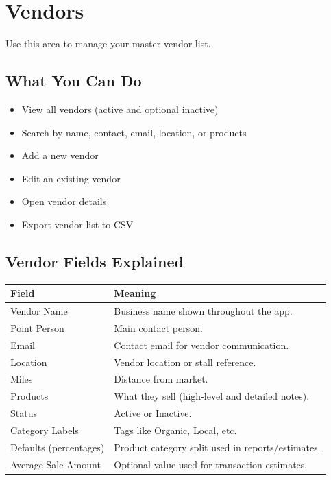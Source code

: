\documentclass[11pt]{article}
\begin{document}
\section{Vendors}
Use this area to manage your master vendor list.

\subsection{What You Can Do}
\begin{itemize}
  \item View all vendors (active and optional inactive)
  \item Search by name, contact, email, location, or products
  \item Add a new vendor
  \item Edit an existing vendor
  \item Open vendor details
  \item Export vendor list to CSV
\end{itemize}

\subsection{Vendor Fields Explained}
\begin{longtable}{p{}p{}}
\textbf{Field} & \textbf{Meaning} \\
\hline
Vendor Name & Business name shown throughout the app. \\
Point Person & Main contact person. \\
Email & Contact email for vendor communication. \\
Location & Vendor location or stall reference. \\
Miles & Distance from market. \\
Products & What they sell (high-level and detailed notes). \\
Status & Active or Inactive. \\
Category Labels & Tags like Organic, Local, etc. \\
Defaults (percentages) & Product category split used in reports/estimates. \\
Average Sale Amount & Optional value used for transaction estimates. \\
\end{longtable}
\end{document}
